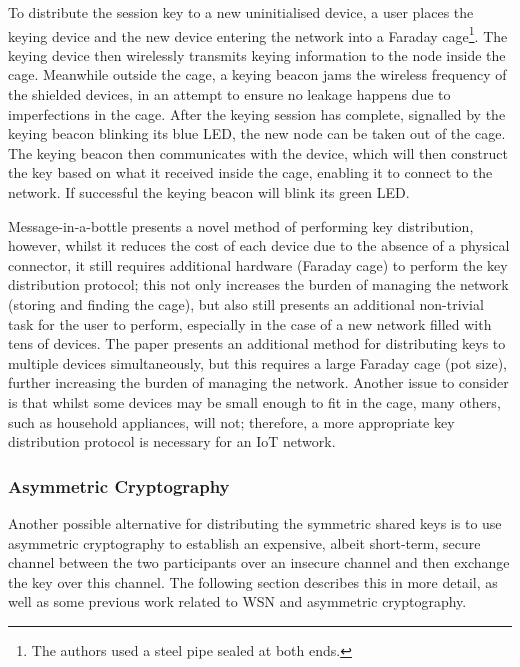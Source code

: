 \documentclass{mprop}
\begin{document}
To distribute the session key to a new uninitialised device, a user places the keying device and the new device entering the network into a Faraday cage\footnote{The authors used a steel pipe sealed at both ends.}. The keying device then wirelessly transmits keying information to the node inside the cage. Meanwhile outside the cage, a keying beacon jams the wireless frequency of the shielded devices, in an attempt to ensure no leakage happens due to imperfections in the cage. After the keying session has complete, signalled by the keying beacon blinking its blue LED, the new node can be taken out of the cage. The keying beacon then communicates with the device, which will then construct the key based on what it received inside the cage, enabling it to connect to the network. If successful the keying beacon will blink its green LED.

Message-in-a-bottle presents a novel method of performing key distribution, however, whilst it reduces the cost of each device due to the absence of a physical connector, it still requires additional hardware (Faraday cage) to perform the key distribution protocol; this not only increases the burden of managing the network (storing and finding the cage), but also still presents an additional non-trivial task for the user to perform, especially in the case of a new network filled with tens of devices. The paper presents an additional method for distributing keys to multiple devices simultaneously, but this requires a large Faraday cage (pot size), further increasing the burden of managing the network. Another issue to consider is that whilst some devices may be small enough to fit in the cage, many others, such as household appliances, will not; therefore, a more appropriate key distribution protocol is necessary for an IoT network.


\subsubsection{Asymmetric Cryptography} %
\label{ssub:asymmetric_cryptography}
Another possible alternative for distributing the symmetric shared keys is to use asymmetric cryptography to establish an expensive, albeit short-term, secure channel between the two participants over an insecure channel and then exchange the key over this channel. The following section describes this in more detail, as well as some previous work related to WSN and asymmetric cryptography.
\end{document}
